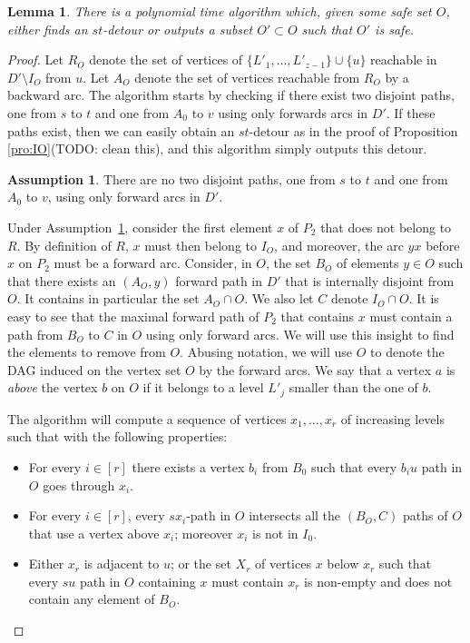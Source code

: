 \documentclass[utf8,11pt]{article}
\theoremstyle{plain}
\newtheorem{lemma}[theorem]{Lemma}
\theoremstyle{definition}
\newtheorem{assumption}{Assumption}
\begin{document}
\begin{lemma}
    There is a polynomial time algorithm which, given some safe set $O$, either finds an $st$-detour or outputs a subset $O' \subset O$ such that $O'$ is safe.
\end{lemma}

\begin{proof}
    Let $R_O$ denote the set of vertices of $\{L'_1, \dots, L'_{z-1} \} \cup \{u\}$ reachable in $D' \setminus I_O$ from $u$. Let $A_O$ denote the set of vertices reachable from $R_O$ by a backward arc. The algorithm starts by checking if there exist two disjoint paths, one from $s$ to $t$ and one from $A_0$ to $v$ using only forwards arcs in $D'$. If these paths exist, then we can easily obtain an $st$-detour as in the proof of Proposition \ref{pro:IO}(TODO: clean this), and this algorithm simply outputs this detour.



    \begin{assumption}\label{ass:no_path_pair}
        There are no two disjoint paths, one from $s$ to $t$ and one from $A_0$ to $v$, using only forward arcs in $D'$.
    \end{assumption}
    
    Under Assumption~\ref{ass:no_path_pair}, consider the first element $x$ of $P_2$ that does not belong to $R$. By definition of $R$, $x$ must then belong to $I_O$, and moreover, the arc $yx$ before $x$ on $P_2$ must be a forward arc. Consider, in $O$, the set $B_O$ of elements $y \in O$ such that there exists an $(A_O,y)$ forward path in $D'$ that is internally disjoint from $O$. It contains in particular the set $A_O \cap O$. We also let $C$ denote $I_O \cap O$. It is easy to see that the maximal forward path of $P_2$ that contains $x$ must contain a path from $B_O$ to $C$ in $O$ using only forward arcs. We will use this insight to find the elements to remove from $O$. Abusing notation, we will use $O$ to denote the DAG induced on the vertex set $O$ by the forward arcs. We say that a vertex $a$ is \textit{above} the vertex $b$ on $O$ if it belongs to a level $L'_j$ smaller than the one of $b$. 

    The algorithm will compute a sequence of vertices $x_1, \dots, x_r$ of increasing levels such that with the following properties: 
    \begin{itemize}
        \item For every $i \in [r]$ there exists a vertex $b_i$ from $B_0$ such that every $b_iu$ path in $O$ goes through $x_i$.
        \item For every $i \in [r]$, every $sx_i$-path in $O$ intersects all the $(B_O,C)$ paths of $O$ that use a vertex above $x_i$; moreover $x_i$ is not in $I_0$.  
        \item Either $x_r$ is adjacent to $u$; or the set $X_r$ of vertices $x$ below $x_r$ such that every $su$ path in $O$ containing $x$ must contain $x_r$ is non-empty and does not contain any element of $B_O$.   
    \end{itemize}



\end{proof}
\end{document}
